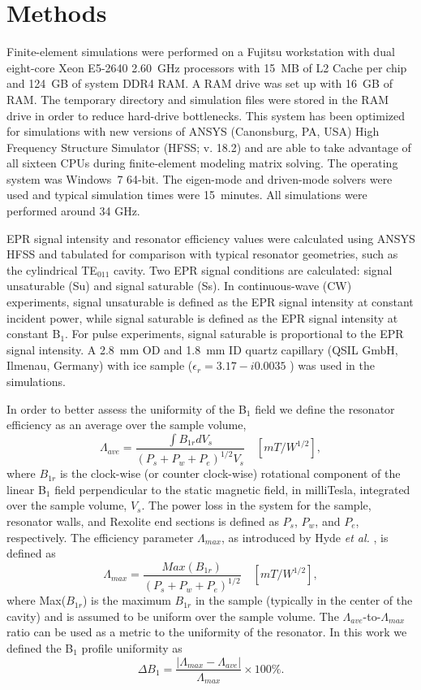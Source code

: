\section{Methods}
Finite-element simulations were performed on a Fujitsu workstation with dual eight-core Xeon E5-2640 2.60~GHz processors with 15~MB of L2 Cache per chip and 124~GB of system DDR4 RAM. A RAM drive was set up with 16~GB of RAM. The temporary directory and simulation files were stored in the RAM drive in order to reduce hard-drive bottlenecks. This system has been optimized for simulations with new versions of ANSYS (Canonsburg, PA, USA) High Frequency Structure Simulator (HFSS; v. 18.2) and are able to take advantage of all sixteen CPUs during finite-element modeling matrix solving. The operating system was Windows~7 64-bit. The eigen-mode  and driven-mode solvers were used and typical simulation times were 15~minutes. All simulations were performed around 34 GHz.

EPR signal intensity and resonator efficiency values were calculated using ANSYS HFSS \cite{misrabook} and tabulated for comparison with typical resonator geometries, such as the cylindrical TE$_{011}$ cavity. \cite{generalte011} Two EPR signal conditions are calculated: signal unsaturable (Su) and signal saturable (Ss). In continuous-wave (CW) experiments, signal unsaturable is defined as the EPR signal intensity at constant incident power, while signal saturable is defined as the EPR signal intensity at constant B$_1$. For pulse experiments, signal saturable is proportional to the EPR signal intensity. A 2.8~mm OD and 1.8~mm ID quartz capillary (QSIL GmbH, Ilmenau, Germany) with ice sample ($\epsilon_r=3.17-i0.0035$ \cite{icedielectric} ) was used in the simulations.

In order to better assess the uniformity of the B$_1$ field we define the resonator efficiency as an average over the sample volume, \begin{equation}
    \Lambda_{ave} = \frac{\int B_{1r} dV_s}{(P_s + P_w + P_e)^{1/2} V_s} \quad [mT/W^{1/2}],
\end{equation}
where $B_{1r}$ is the clock-wise (or counter clock-wise) rotational component of the linear B$_1$ field perpendicular to the static magnetic field, in milliTesla, integrated over the sample volume, $V_s$. \cite{UFLGR2017} The power loss in the system for the sample, resonator walls, and Rexolite end sections is defined as $P_s$, $P_w$, and $P_e$, respectively. The efficiency parameter $\Lambda_{max}$, as introduced by Hyde {\em et al.} \cite{hydehoff}, is defined as
\begin{equation}
    \Lambda_{max} = \frac{Max(B_{1r})}{(P_s + P_w + P_e)^{1/2}} \quad [mT/W^{1/2}],
\end{equation}
where Max($B_{1r}$) is the maximum $B_{1r}$ in the sample (typically in the center of the cavity) and is assumed to be uniform over the sample volume. The $\Lambda_{ave}$-to-$\Lambda_{max}$ ratio can be used as a metric to the uniformity of the resonator. \cite{UFLGR2017} In this work we defined the B$_1$ profile uniformity as 
\begin{equation}
    \Delta B_1 = \frac{\left| \Lambda_{max} - \Lambda_{ave} \right|}{\Lambda_{max}} \times 100\%.
\end{equation}


